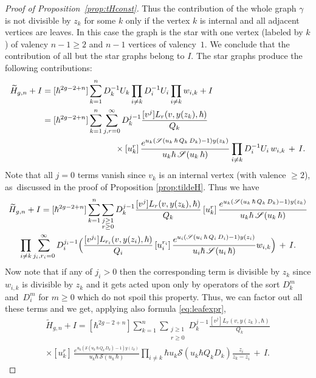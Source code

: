 \documentclass[JEP,XML,SOM,Unicode,NoEqCountersInSection,NoFloatCountersInSection]{cedram}
\let\mathcal\mathscr
\theoremstyle{plain}
\theoremstyle{definition}
\theoremstyle{remark}
\newcommand{\cS}{\mathcal{S}}
\begin{document}
\begin{proof}[Proof of Proposition~\ref{prop:tHconst}]
Thus the contribution of the whole graph $\gamma$ is not divisible by $z_k$ for some $k$ only if the vertex $k$ is internal and all adjacent vertices are leaves. In this case the graph is the star with one vertex (labeled by $k$) of valency $n-1\geq 2$ and $n-1$ vertices of valency~$1$. We conclude that the contribution of all but the star graphs belong to $I$. The star graphs produce the following contributions:
\begin{align*}
\widetilde{H}_{g,n}+I &=[\hbar^{2g-2+n}]\sum\limits_{k=1}^n D_k^{-1} U_k\prod_{i\ne k} D_i^{-1}U_i\prod_{i\ne k}w_{i,k}+I\\
&=[\hbar^{2g-2+n}]\sum\limits_{k=1}^n \sum_{j,r=0}^\infty D_k^{j-1}\frac{[v^j]L_r(v,y(z_k),\hbar)}{Q_k}\\
&\hspace*{3cm}\times[u_k^r]\, \frac{e^{u_k(\cS(u_k\,\hbar\,Q_k\,D_k)-1)y(z_k)}}{u_k\hbar\,\cS(u_k\,\hbar)}\prod_{i\ne k} D_i^{-1}U_i\,w_{i,k}\,+\,I.
\end{align*}
Note that all $j=0$ terms vanish since $v_k$ is an internal vertex (with valence $\geq 2$), as~discussed in the proof of Proposition \ref{prop:tildeH}. Thus we have
\begin{multline*}
\widetilde{H}_{g,n}+I =[\hbar^{2g-2+n}]\sum\limits_{k=1}^n \sum_{\substack{j\geq 1 \\ r \geq 0}} D_k^{j-1}\frac{[v^j]L_r(v,y(z_k),\hbar)}{Q_k}
\,[u_k^r]\, \frac{e^{u_k(\cS(u_k\,\hbar\,Q_k\,D_k)-1)y(z_k)}}{u_k\hbar\,\cS(u_k\,\hbar)}
\\
\prod_{i\ne k} \sum_{j_i,r_i=0}^\infty D_i^{j_i-1}\Bigl(\frac{[v^{j_i}]L_{r_i}(v,y(z_i),\hbar)}{Q_i}
\,[u_i^{r_i}]\, \frac{e^{u_i(\cS(u_i\,\hbar\,Q_i\,D_i)-1)y(z_i)}}{u_i\hbar\,\cS(u_i\,\hbar)}w_{i,k} \Bigr)\,+\,I.
\end{multline*}
Now note that if any of $j_i>0$ then the corresponding term is divisible by $z_k$ since $w_{i,k}$ is divisible by $z_k$ and it gets acted upon only by operators of the sort $D_k^m$ and~$D_i^m$ for $m\geq 0$ which do not spoil this property. Thus, we can factor out all these terms and we get, applying also formula \eqref{eq:leafexpr},
\begin{multline} \label{eq:HtildeI}
\widetilde{H}_{g,n}+I
=[\hbar^{2g-2+n}]\sum\limits_{k=1}^n \sum_{\substack{j\geq 1 \\ r \geq 0}} D_k^{j-1}\frac{[v^j]L_r(v,y(z_k),\hbar)}{Q_k}
\\
\times[u_k^r]\, \frac{e^{u_k(\cS(u_k\,\hbar\,Q_k\,D_k)-1)y(z_k)}}{u_k\hbar\,\cS(u_k\,\hbar)}
\prod_{i\ne k}
\hbar u_k \cS(u_k\hbar Q_kD_k)\frac{z_i}{z_k-z_i}\,+\,I.

\end{multline}
\end{proof}
\end{document}
